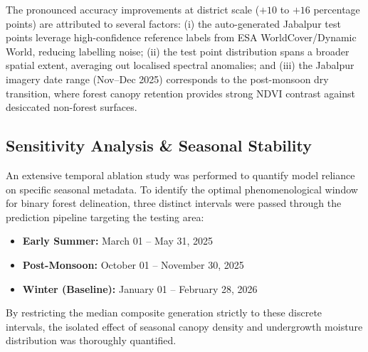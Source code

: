 \documentclass[12pt, a4paper, twocolumn]{article}
\begin{document}
The pronounced accuracy improvements at district scale ($+10$ to $+16$ percentage points) are attributed to several factors: (i) the auto-generated Jabalpur test points leverage high-confidence reference labels from ESA WorldCover/Dynamic World, reducing labelling noise;
(ii) the test point distribution spans a broader spatial extent, averaging out localised spectral anomalies;
and (iii) the Jabalpur imagery date range (Nov--Dec 2025) corresponds to the post-monsoon dry transition, where forest canopy retention provides strong NDVI contrast against desiccated non-forest surfaces.

\subsection{Sensitivity Analysis \& Seasonal Stability}

An extensive temporal ablation study was performed to quantify model reliance on specific seasonal metadata.
To identify the optimal phenomenological window for binary forest delineation, three distinct intervals were passed through the prediction pipeline targeting the testing area:

\begin{itemize}
    \item \textbf{Early Summer:} March 01 -- May 31, 2025
    \item \textbf{Post-Monsoon:} October 01 -- November 30, 2025
    \item \textbf{Winter (Baseline):} January 01 -- February 28, 2026
\end{itemize}

By restricting the median composite generation strictly to these discrete intervals, the isolated effect of seasonal canopy density and undergrowth moisture distribution was thoroughly quantified.

\begin{table}[H]
\centering
\caption{Seasonal accuracy comparisons demonstrating catastrophic classification collapses outside of the dry Winter season bounds.}
\label{tab:seasons}
\end{table}
\end{document}
